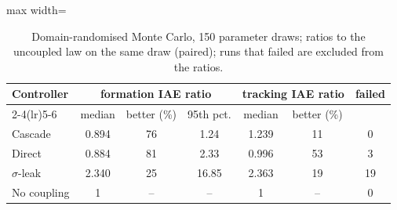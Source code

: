 \begin{table}[htbp]\centering\small
\caption{Domain-randomised Monte Carlo, 150 parameter draws; ratios to the uncoupled law on the same draw (paired); runs that failed are excluded from the ratios.}\label{tab:r5}
\begin{adjustbox}{max width=\linewidth}
\begin{tabular}{@{}lcccccc@{}}\toprule
Controller & \multicolumn{3}{c}{formation IAE ratio} & \multicolumn{2}{c}{tracking IAE ratio} & failed\\\cmidrule(lr){2-4}\cmidrule(lr){5-6} & median & better (\%) & 95th pct. & median & better (\%) &\\\midrule
Cascade & 0.894 & 76 & 1.24 & 1.239 & 11 & 0\\
Direct & 0.884 & 81 & 2.33 & 0.996 & 53 & 3\\
$\sigma$-leak & 2.340 & 25 & 16.85 & 2.363 & 19 & 19\\
No coupling & 1 & -- & -- & 1 & -- & 0\\
\bottomrule\end{tabular}
\end{adjustbox}
\end{table}
